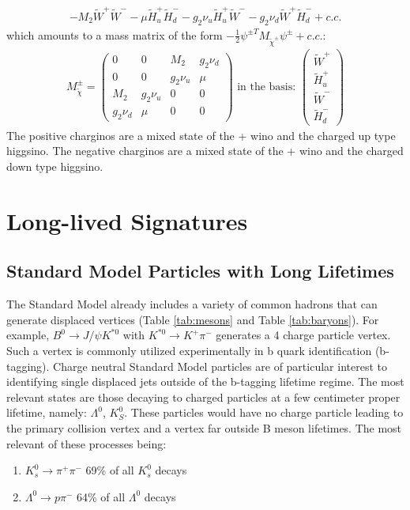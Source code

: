 \begin{align*}
-M_2\tilde{W}^+\tilde{W}^- - \mu \tilde{H}_u^+ \tilde{H}_d^- -  g_2 \nu_u \tilde{H}_u^+ \tilde{W}^- - g_2 
\nu_d \tilde{W}^+\tilde{H}_d^- + c.c.
\end{align*}
which amounts to a mass matrix of the form $-\frac{1}{2}\psi^{\pm T} M_{\tilde{\chi}^\pm} \psi^\pm + c.c.$:
\begin{align*}
M_{\tilde{\chi}}^\pm =
\begin{pmatrix} 
0        & 0        & M_2      & g_2\nu_d \\
0        & 0      & g_2\nu_u & \mu \\
M_2      & g_2\nu_u & 0        & 0   \\
g_2\nu_d & \mu      & 0        & 0 \end{pmatrix} \text{ in the basis: } 
\begin{pmatrix} \tilde{W}^+ \\ \tilde{H}_u^+ \\ \tilde{W}^- \\  \tilde{H}_d^- \end{pmatrix}
\end{align*}
The positive charginos are a mixed state of the + wino and the charged up type higgsino. The negative charginos are a mixed state of the + wino and the charged down type higgsino.

\section{Long-lived Signatures}

\subsection{Standard Model Particles with Long Lifetimes}

The Standard Model already includes a variety of common hadrons that can generate
displaced vertices (Table \ref{tab:mesons} and Table \ref{tab:baryons}). 
For example, $B^0 \rightarrow J/\psi K^{*0}$ with $K^{*0} \rightarrow K^+\pi^-$ 
generates a 4 charge particle vertex. 
Such a vertex is commonly utilized experimentally in 
b quark identification (b-tagging). Charge neutral Standard Model particles are of particular
 interest to identifying single displaced jets outside of the b-tagging lifetime regime. The most relevant states are those decaying to charged particles
 at a few centimeter proper lifetime, namely: $\Lambda^0$, $K_S^0$. 
These particles would have no charge particle leading 
to the primary collision vertex and a vertex
far outside B meson lifetimes. The most relevant of these processes being:
\begin{enumerate}
\item $K_s^0 \rightarrow \pi^+\pi^-$ 69\% of all $K_s^0$ decays 
\item $\Lambda^0 \rightarrow p \pi^-$ 64\% of all $\Lambda^0$ decays 
\end{enumerate}

